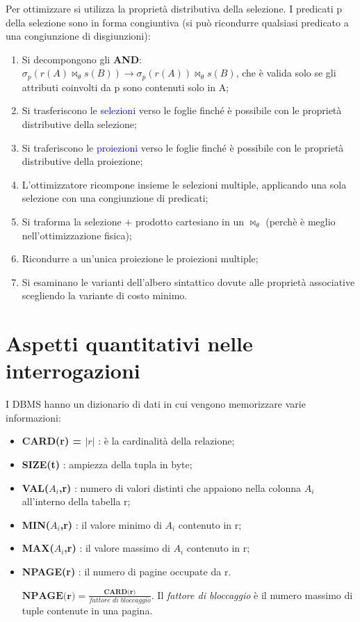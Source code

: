 Per ottimizzare si utilizza la proprietà distributiva della selezione. I predicati p della selezione sono in forma congiuntiva (si può ricondurre qualsiasi predicato a una congiunzione di disgiunzioni):
\begin{enumerate}
    \item Si decompongono gli \textbf{AND}: $\sigma_p (r(A) \bowtie_\theta s(B))\rightarrow \sigma_p (r(A)) \bowtie_\theta s(B)$, che è valida solo se gli attributi coinvolti da p sono contenuti solo in A;
    \item Si trasferiscono le \textcolor{blue}{selezioni} verso le foglie finché è possibile con le proprietà distributive della selezione;
    \item Si traferiscono le \textcolor{blue}{proiezioni} verso le foglie finché è possibile con le proprietà distributive della proiezione;
    \item L’ottimizzatore ricompone insieme le selezioni multiple, applicando una sola selezione con una congiunzione di predicati;
    \item Si traforma la selezione + prodotto cartesiano in un $\bowtie_\theta$ (perchè è meglio nell'ottimizzazione fisica);
    \item Ricondurre a un’unica proiezione le proiezioni multiple;
    \item Si esaminano le varianti dell’albero sintattico dovute alle proprietà associative scegliendo la variante di costo minimo.
\end{enumerate}

\section{Aspetti quantitativi nelle interrogazioni}
I DBMS hanno un dizionario di dati in cui vengono memorizzare varie informazioni:
\begin{itemize}
    \item \textbf{CARD(r) = $|r|$} : è la cardinalità della relazione;
    \item \textbf{SIZE(t)} : ampiezza della tupla in byte;
    \item \textbf{VAL($A_i$,r)} : numero di valori distinti che appaiono nella colonna $A_i$ all'interno della tabella r;
    \item \textbf{MIN($A_i$,r)} : il valore minimo di $A_i$ contenuto in r;
    \item \textbf{MAX($A_i$,r)} : il valore massimo di $A_i$ contenuto in r;
    \item \textbf{NPAGE(r)} : il numero di pagine occupate da r. 
    
    $\textbf{NPAGE(r)} = \frac{\textbf{CARD(r)}}{\textit{fattore di bloccaggio}}$. Il \textit{fattore di bloccaggio} è il numero massimo di tuple contenute in una pagina.
\end{itemize}

